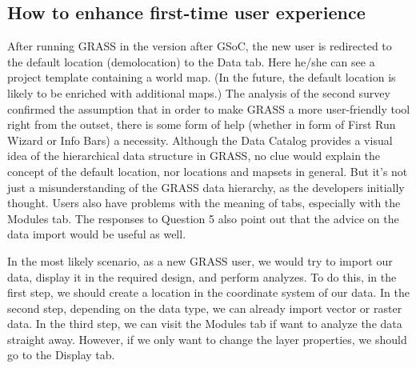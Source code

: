 \documentclass[a4paper,10pt,twoside]{article}
\begin{document}
\subsection{How to enhance first-time user experience}
\label{sec:proposal1}

After running GRASS in the version after GSoC, the new user is redirected to the default location (demolocation) to the Data tab. Here he/she can see a project template containing a world map. (In the future, the default location is likely to be enriched with additional maps.) The analysis of the second survey confirmed the assumption that in order to make GRASS a more user-friendly tool right from the outset, there is some form of help (whether in form of First Run Wizard or Info Bars) a necessity. Although the Data Catalog provides a visual idea of the hierarchical data structure in GRASS, no clue would explain the concept of the default location, nor locations and mapsets in general. But it's not just a misunderstanding of the GRASS data hierarchy, as the developers initially thought. Users also have problems with the meaning of tabs, especially with the Modules tab. The responses to Question 5 also point out that the advice on the data import would be useful as well.

In the most likely scenario, as a new GRASS user, we would try to import our data, display it in the required design, and perform analyzes. To do this, in the first step, we should create a location in the coordinate system of our data. In the second step, depending on the data type, we can already import vector or raster data. In the third step, we can visit the Modules tab if want to analyze the data straight away. However, if we only want to change the layer properties, we should go to the Display tab.
\end{document}
